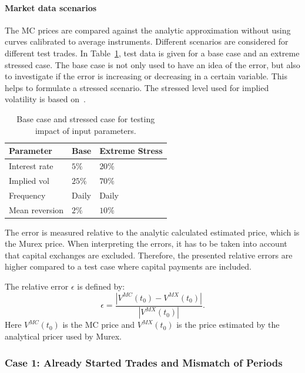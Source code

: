 \documentclass[]{pmv_report} %
\begin{document}
\paragraph{Market data scenarios}
The MC prices are compared against the analytic approximation without using curves calibrated to average instruments.
Different scenarios are considered for different test trades.
In Table~\ref{tab:baseandStressedCase}, test data is given for a base case and an extreme stressed case.
The base case is not only used to have an idea of the error, but also to investigate if the error is increasing or decreasing in a certain variable.
This helps to formulate a stressed scenario.
The stressed level used for implied volatility is based on~\cite{Fornari05}.

\begin{table}[H]
\footnotesize
\centering
\begin{tabular}{l|l|l}
  \toprule[0.05cm]
  \textbf{Parameter} & \textbf{Base} & \textbf{Extreme Stress} \\
  \hline\hline
  Interest rate  & $5\%$   & $20\%$ \\ \hline
  Implied vol    & $25\%$  & $70\%$ \\ \hline
  Frequency      & Daily & Daily  \\ \hline
  Mean reversion & $2\%$   & $10\%$ \\
  \bottomrule[0.05cm]
\end{tabular}
\caption{Base case and stressed case for testing impact of input parameters.}
\label{tab:baseandStressedCase}
\end{table}

The error is measured relative to the analytic calculated estimated price, which is the Murex price.
When interpreting the errors, it has to be taken into account that capital exchanges are excluded.
Therefore, the presented relative errors are higher compared to a test case where capital payments are included.

The relative error $\epsilon$ is defined by:
\begin{equation*}
 \epsilon = \frac{ |V^{MC}(t_0) - V^{MX}(t_0)| }{ |V^{MX}(t_0)|}.
\end{equation*}
Here $V^{MC}(t_0)$ is the MC price and $V^{MX}(t_0)$ is the price estimated by the analytical pricer used by Murex.

\subsubsection*{Case 1: Already Started Trades and Mismatch of Periods}
\end{document}
